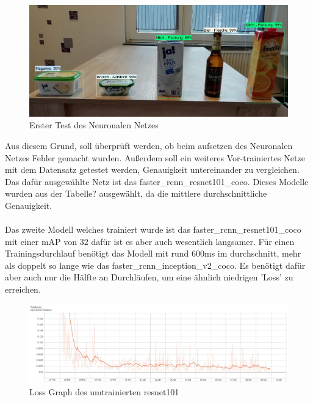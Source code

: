 \documentclass[a4paper,12pt,oneside]{article}
\begin{document}
\begin{figure}
    [h]
	\centering
	\includegraphics[scale=0.3]{Sources/Erster_Test.jpg}
	\caption{Erster Test des Neuronalen Netzes}
	\label{img:TestNN}
\end{figure}

Aus diesem Grund, soll überprüft werden, ob beim aufsetzen des Neuronalen Netzes Fehler gemacht wurden. Außerdem soll ein weiteres Vor-trainiertes Netze mit dem Datensatz getestet werden, Genauigkeit untereinander zu vergleichen. Das dafür ausgewählte Netz ist das faster\_rcnn\_resnet101\_coco. Dieses Modelle wurden aus der Tabelle? ausgewählt, da die mittlere durchschnittliche Genauigkeit.
\\
\\
Das zweite Modell welches trainiert wurde ist das faster\_rcnn\_resnet101\_coco mit einer mAP von 32 dafür ist es aber auch wesentlich langsamer. Für einen Trainingsdurchlauf benötigt das Modell mit rund 600ms im durchschnitt, mehr als doppelt so lange wie das faster\_rcnn\_inception\_v2\_coco. Es benötigt dafür aber auch nur die Hälfte an Durchläufen, um eine ähnlich niedrigen 'Loss' zu erreichen.\\ 

\begin{figure}
    [h]
	\centering
	\includegraphics[scale=0.4]{Sources/loss_graph_resnet101.jpg}
	\vspace{0.5 cm}
	\caption{Loss Graph des umtrainierten resnet101}
	\label{img:loss_graph_resnet101}
\end{figure}
\end{document}
